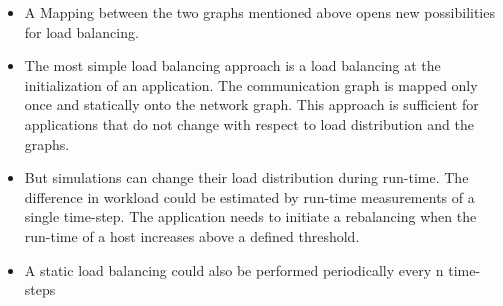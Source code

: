 \begin{itemize}
\item A Mapping between the two graphs mentioned above opens new
  possibilities for load balancing.

\item The most simple load balancing approach is a load balancing at
  the initialization of an application. The communication graph is
  mapped only once and statically onto the network graph. This
  approach is sufficient for applications that do not change with
  respect to load distribution and the graphs.

\item But simulations can change their load distribution during
  run-time. The difference in workload could be estimated by run-time
  measurements of a single time-step. The application needs to
  initiate a rebalancing when the run-time of a host increases above a
  defined threshold.

\item A static load balancing could also be performed periodically every
  n time-steps

\end{itemize}


